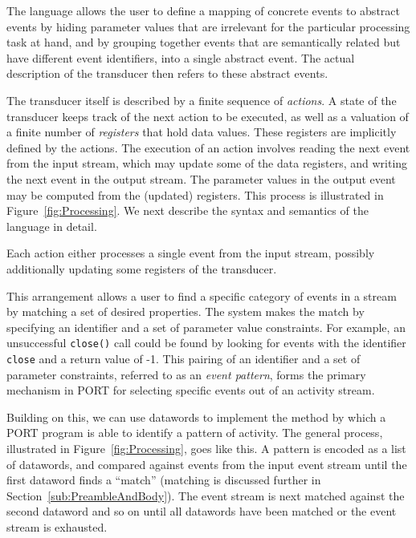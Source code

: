 The language allows the user to define a mapping of concrete events to abstract events by hiding parameter values that are irrelevant for the particular processing task at hand, and by grouping together events that are semantically related but have different event identifiers, into a single abstract event. The actual description of the transducer then refers to these abstract events.

The transducer itself is described by a finite sequence of \emph{actions}. A state of the transducer keeps track of the next action to be executed, as well as a valuation of a finite number of \emph{registers} that hold data values. These registers are implicitly defined by the actions. The execution of an action involves reading the next event from the input stream, which may update some of the data registers, and writing the next event in the output stream. The parameter values in the output event may be computed from the (updated) registers. This process is illustrated in
Figure~\ref{fig:Processing}. We next describe the syntax and semantics of the language in detail.

\iffalse
Each action either processes a single event from the input stream, possibly additionally updating some registers of the transducer.

This arrangement allows a user to find
a specific category of events
in a stream
by matching a set of desired properties.
The system makes the match by specifying
an identifier and a set of parameter value
constraints.  For example, an unsuccessful {\tt close()} call could be
found by looking for events with the identifier {\tt close} and a return
value of -1.  This pairing of an identifier and a set of parameter
constraints, referred to as an \emph{event pattern}, forms the primary mechanism in PORT for
selecting specific events out of an activity stream.

Building on this, we can use datawords to implement the method by which
a PORT program is able to
identify a  pattern of activity.
The general process, illustrated in Figure~\ref{fig:Processing}, goes like
this.  A pattern is encoded as a list of datawords, and compared against
events from the
input event stream until the first dataword
finds a ``match'' (matching is discussed further in
Section~\ref{sub:PreambleAndBody}).  The event stream is next matched
against the
second dataword
and so on until all datawords have been matched or the event stream is
exhausted.


%
%


